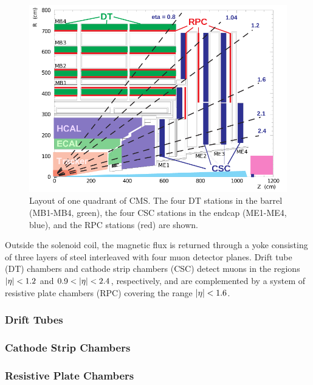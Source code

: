 \begin{figure}[htbp]
\centering
     \includegraphics[width=1.0\textwidth]{cms_and_lhc/plots/cms_muon_syst.png}
     \caption{
Layout of one quadrant of CMS. The four DT stations in the barrel (MB1-MB4, green), the four CSC stations in the endcap (ME1-ME4, blue), and the RPC stations (red) are shown.
     }
     \label{fig:cms_muon_syst}
\end{figure}



Outside the solenoid coil, the magnetic flux is returned through a yoke consisting of three 
layers of steel interleaved with four muon detector planes. Drift tube (DT) chambers and 
cathode strip chambers (CSC) detect muons in the regions $\lvert\eta\rvert < 1.2$ and $0.9 < \lvert\eta\rvert < 2.4$, 
respectively, and are complemented by a system of resistive plate chambers (RPC) covering the range $\lvert\eta\rvert < 1.6$.

\subsubsection{Drift Tubes}
\subsubsection{Cathode Strip Chambers}
\subsubsection{Resistive Plate Chambers}
